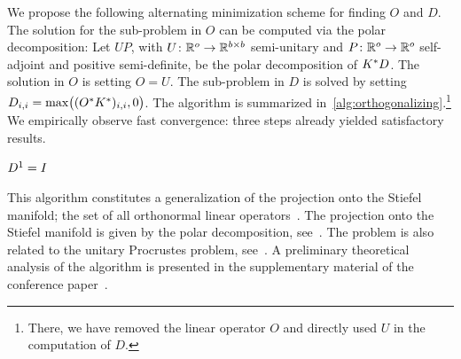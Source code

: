 We propose the following alternating minimization scheme for finding \( O \) and \( D \).
The solution for the sub-problem in \( O \) can be computed via the polar decomposition:
Let \( UP \), with \( U \colon \mathbb{R}^{o} \to \mathbb{R}^{b\times b} \) semi-unitary and \( P \colon \mathbb{R}^{o} \to \mathbb{R}^o \) self-adjoint and positive semi-definite, be the polar decomposition of \( K^{\ast}D \).
The solution in \( O \) is setting \( O = U \).
The sub-problem in \( D \) is solved by setting \( D_{i,i} = \max\bigl((O^{\ast}K^{\ast})_{i,i}, \num{0} \bigr) \).
The algorithm is summarized in~\cref{alg:orthogonalizing}.\footnote{%
	There, we have removed the linear operator \( O \) and directly used \( U \) in the computation of \( D \).
}
We empirically observe fast convergence:
three steps already yielded satisfactory results.
\begin{algorithm}[t]
	\DontPrintSemicolon
	\( D^{1} = I \)\;
	\caption{%
		Algorithm for orthogonalizing a set of filters \( K \).
	}%
	\label{alg:orthogonalizing}
\end{algorithm}

This algorithm constitutes a generalization of the projection onto the Stiefel manifold;
the set of all orthonormal linear operators~\cite[section 3.3.2]{Absil2008}.
The projection onto the Stiefel manifold is given by the polar decomposition, see~\cite[eq. (4)]{HERTRICH2021203}.
The problem is also related to the unitary Procrustes problem, see~\cite[section 7.4.5]{Horn_Johnson_1985}.
A preliminary theoretical analysis of the algorithm is presented in the supplementary material of the conference paper~\cite{zach_explicit_2023}.


